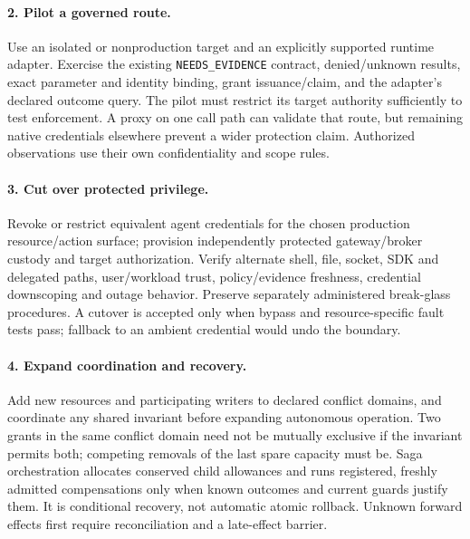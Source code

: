 \paragraph{2. Pilot a governed route.}
Use an isolated or nonproduction target and an explicitly supported runtime adapter. Exercise the existing \texttt{NEEDS\_EVIDENCE} contract, denied/unknown results, exact parameter and identity binding, grant issuance/claim, and the adapter's declared outcome query. The pilot must restrict its target authority sufficiently to test enforcement. A proxy on one call path can validate that route, but remaining native credentials elsewhere prevent a wider protection claim. Authorized observations use their own confidentiality and scope rules.

\paragraph{3. Cut over protected privilege.}
Revoke or restrict equivalent agent credentials for the chosen production resource/action surface; provision independently protected gateway/broker custody and target authorization. Verify alternate shell, file, socket, SDK and delegated paths, user/workload trust, policy/evidence freshness, credential downscoping and outage behavior. Preserve separately administered break-glass procedures. A cutover is accepted only when bypass and resource-specific fault tests pass; fallback to an ambient credential would undo the boundary.

\paragraph{4. Expand coordination and recovery.}
Add new resources and participating writers to declared conflict domains, and coordinate any shared invariant before expanding autonomous operation. Two grants in the same conflict domain need not be mutually exclusive if the invariant permits both; competing removals of the last spare capacity must be. Saga orchestration allocates conserved child allowances and runs registered, freshly admitted compensations only when known outcomes and current guards justify them. It is conditional recovery, not automatic atomic rollback. Unknown forward effects first require reconciliation and a late-effect barrier.

